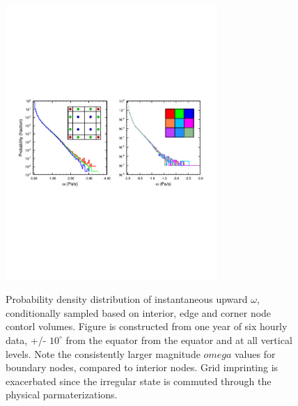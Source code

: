 \documentclass[twocol]{ametsoc}
\begin{document}
\begin{figure}[t]
\noindent\includegraphics[width=19pc,angle=0]{figs/temp_pdf_omg_np4_v_pg3.pdf}\\
\caption{Probability density distribution of instantaneous upward $\omega$, conditionally sampled based on interior, edge and corner node contorl volumes. Figure is constructed from one year of six hourly data, +/- $10^\circ$ from the equator from the equator and at all vertical levels. Note the consistently larger magnitude $omega$ values for boundary nodes, compared to interior nodes. Grid imprinting is exacerbated since the irregular state is commuted through the physical parmaterizations.}\label{fig:omega-se-volumes}
\end{figure}

\end{document}
